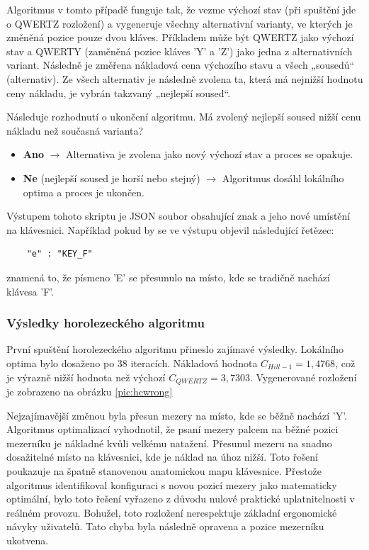 \documentclass[a4paper, twoside, 12pt, czech]{article}
\begin{document}
Algoritmus v tomto případě funguje tak, že vezme výchozí stav (při spuštění jde o QWERTZ
rozložení) a vygeneruje všechny alternativní varianty, ve kterých je změněná pozice 
pouze dvou kláves. Příkladem může být QWERTZ jako výchozí stav a QWERTY (zaměněná pozice 
kláves 'Y' a 'Z') jako jedna z alternativních variant. Následně je změřena nákladová cena 
výchozího stavu a všech „sousedů“ (alternativ). Ze všech alternativ je následně zvolena ta,
která má nejnižší hodnotu ceny nákladu, je vybrán takzvaný „nejlepší soused“.

Následuje rozhodnutí o ukončení algoritmu. Má zvolený nejlepší soused nižší cenu nákladu 
než současná varianta?
\begin{itemize}
    \item \textbf{Ano} $\rightarrow$ Alternativa je zvolena jako nový výchozí stav a 
    proces se opakuje.
    \item \textbf{Ne} (nejlepší soused je horší nebo stejný) $\rightarrow$ Algoritmus dosáhl
    lokálního optima a proces je ukončen. 
\end{itemize}

Výstupem tohoto skriptu je JSON soubor obsahující znak a jeho nové umístění na klávesnici.
Například pokud by se ve výstupu objevil následující řetězec:
\begin{verbatim}
    "e" : "KEY_F"
\end{verbatim}
znamená to, že písmeno 'E' se přesunulo na místo, kde se tradičně nachází 
klávesa 'F'.

\subsubsection{Výsledky horolezeckého algoritmu}
První spuštění horolezeckého algoritmu přineslo zajímavé výsledky. Lokálního optima bylo 
dosaženo po 38 iteracích. Nákladová hodnota $C_{Hill-1}=1,4768$, což je výrazně nižší hodnota
než výchozí $C_{QWERTZ}=3,7303$. Vygenerované rozložení je zobrazeno na obrázku \ref{pic:hcwrong}

Nejzajímavější změnou byla přesun mezery na místo, kde se běžně nachází 'Y'.
Algoritmus optimalizací vyhodnotil, že psaní mezery palcem na běžné pozici
mezerníku je nákladné kvůli velkému natažení. Přesunul mezeru na snadno 
dosažitelné místo na klávesnici, kde je náklad na úhoz nižší. Toto řešení poukazuje 
na špatně stanovenou anatomickou mapu klávesnice.
Přestože algoritmus identifikoval konfiguraci s novou pozicí mezery jako 
matematicky optimální, bylo toto řešení vyřazeno z důvodu nulové praktické 
uplatnitelnosti v reálném provozu. Bohužel, toto rozložení nerespektuje základní 
ergonomické návyky uživatelů. 
Tato chyba byla následně opravena a pozice mezerníku ukotvena.
\end{document}
